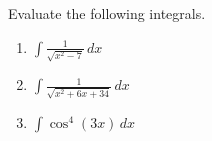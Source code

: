 \documentclass{exam}[12pt]
\begin{document}
\pagestyle{head}

\extraheadheight{.3in}
\extrafootheight{-.3in} 


\vspace{.2in}
\large{
Evaluate the following integrals.
\begin{enumerate}
\item $\displaystyle \int \frac{1}{\sqrt{x^2 - 7}}   \, dx$
\vspace{1.5in}

\item $\displaystyle \int \frac{1}{\sqrt{x^2 +6x + 34}}   \, dx$
\vspace{1.5in}

\item $\displaystyle \int \cos^4(3x) \, dx$




\end{enumerate}
}
\end{document}
